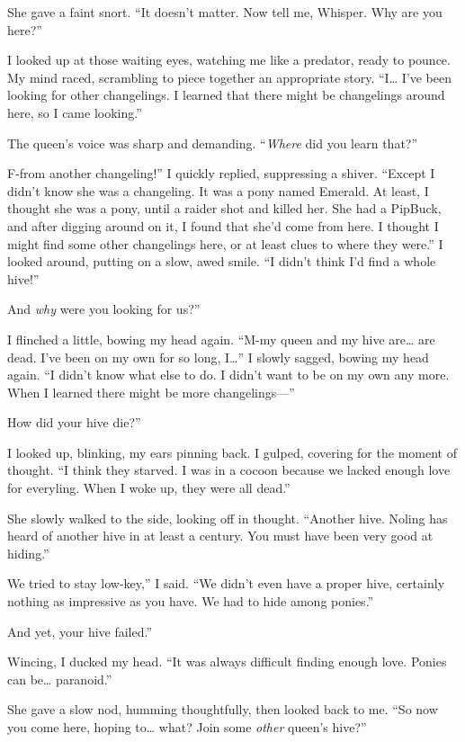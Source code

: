 She gave a faint snort. “It doesn’t matter. Now tell me, Whisper. Why are you here?”

I looked up at those waiting eyes, watching me like a predator, ready to pounce. My mind raced, scrambling to piece together an appropriate story. “I… I’ve been looking for other changelings. I learned that there might be changelings around here, so I came looking.”

The queen’s voice was sharp and demanding. “\textit{Where} did you learn that?”

\leavevmode{}F-from another changeling!” I quickly replied, suppressing a shiver. “Except I didn’t know she was a changeling. It was a pony named Emerald. At least, I thought she was a pony, until a raider shot and killed her. She had a PipBuck, and after digging around on it, I found that she’d come from here. I thought I might find some other changelings here, or at least clues to where they were.” I looked around, putting on a slow, awed smile. “I didn’t think I’d find a whole hive!”

\leavevmode{}And \textit{why} were you looking for us?”

I flinched a little, bowing my head again. “M-my queen and my hive are… are dead. I’ve been on my own for so long, I…” I slowly sagged, bowing my head again. “I didn’t know what else to do. I didn’t want to be on my own any more. When I learned there might be more changelings—”

\leavevmode{}How did your hive die?”

I looked up, blinking, my ears pinning back. I gulped, covering for the moment of thought. “I think they starved. I was in a cocoon because we lacked enough love for everyling. When I woke up, they were all dead.”

She slowly walked to the side, looking off in thought. “Another hive. Noling has heard of another hive in at least a century. You must have been very good at hiding.”

\leavevmode{}We tried to stay low-key,” I said. “We didn’t even have a proper hive, certainly nothing as impressive as you have. We had to hide among ponies.”

\leavevmode{}And yet, your hive failed.”

Wincing, I ducked my head. “It was always difficult finding enough love. Ponies can be… paranoid.”

She gave a slow nod, humming thoughtfully, then looked back to me. “So now you come here, hoping to… what? Join some \textit{other} queen’s hive?”

